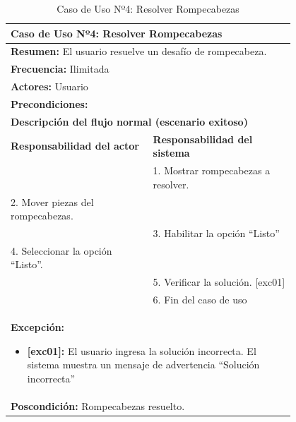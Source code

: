 \begin{table}[H]
    \centering
    \caption{Caso de Uso Nº4: Resolver Rompecabezas}
    \vspace{10pt}
    
    \begin{tabular}{| p{0.4\linewidth} | p{0.4\linewidth} |}
        \hline
        \multicolumn{2}{|l|}{\textbf{Caso de Uso Nº4:} Resolver Rompecabezas} \\
        \hline
        \multicolumn{2}{|l|}{\textbf{Resumen:} El usuario resuelve un desafío de rompecabeza.} \\
        \hline
        \multicolumn{2}{|l|}{\textbf{Frecuencia:} Ilimitada} \\
        \hline
        \multicolumn{2}{|l|}{\textbf{Actores:} Usuario} \\
        \hline
        \multicolumn{2}{|l|}{\textbf{Precondiciones:}} \\
        \hline
        \multicolumn{2}{|l|}{\textbf{Descripción del flujo normal (escenario exitoso)} } \\
        \hline
        \textbf{Responsabilidad del actor} & \textbf{Responsabilidad del sistema} \\
        & 1. Mostrar rompecabezas a resolver. \\
        2. Mover piezas del rompecabezas. \\
        & 3. Habilitar la opción “Listo” \\
        4. Seleccionar la opción “Listo”. \\
        & 5. Verificar la solución. [exc01] \\
        & 6. Fin del caso de uso \\
        \hline
        \multicolumn{2}{|p{0.8\linewidth}|}{
            \textbf{Excepción:}
            \begin{itemize}
                \item \textbf{[exc01]:} El usuario ingresa la solución incorrecta. El sistema muestra un mensaje de advertencia ``Solución incorrecta”
            \end{itemize}}\\
        \hline
        \multicolumn{2}{|l|}{\textbf{Poscondición:} Rompecabezas resuelto.} \\
        \hline
    \end{tabular}

    \label{table:4}
\end{table}

